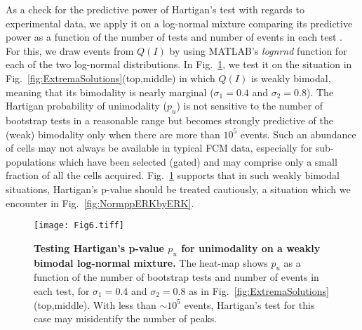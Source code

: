 \documentclass[11pt,a4paper,draft]{article}
\begin{document}
As a check for the predictive power of Hartigan's test with regards to experimental data, we apply it on a log-normal mixture comparing its predictive power as a function of the number of tests and number of events in each test \cite{NicPrice}. For this, we draw events from $Q(I)$ by using MATLAB's \emph{lognrnd} function for each of the two log-normal distributions. In Fig.~\ref{fig:CheckHartigan}, we test it on the situation in Fig.~\ref{fig:ExtremaSolutions}(top,middle) in which $Q(I)$ is weakly bimodal, meaning that its bimodality is nearly marginal ($\sigma_1=0.4$ and $\sigma_2=0.8$). The Hartigan probability of unimodality ($p_u$) is not sensitive to the number of bootstrap tests in a reasonable range but becomes strongly predictive of the (weak) bimodality only when there are more than $10^5$ events. Such an abundance of cells may not always be available in typical FCM data, especially for sub-populations which have been selected (gated) and may comprise only a small fraction of all the cells acquired. Fig.~\ref{fig:CheckHartigan} supports that in such weakly bimodal situations, Hartigan's p-value should be treated cautiously, a situation which we encounter in Fig.~\ref{fig:NormppERKbyERK}. \smallskip

\begin{figure}[!ht]
 \centering
 \texttt{[image: Fig6.tiff]}
  \caption{\textbf{Testing Hartigan's p-value $p_u$ for unimodality on a weakly bimodal log-normal mixture.} The heat-map shows $p_u$ as a function of the number of bootstrap tests and number of events in each test, for $\sigma_1=0.4$ and $\sigma_2=0.8$ as in Fig.~\ref{fig:ExtremaSolutions}(top,middle). With less than $\sim10^5$ events, Hartigan's test for this case may misidentify the number of peaks.}
  \label{fig:CheckHartigan}
\end{figure}
\end{document}
